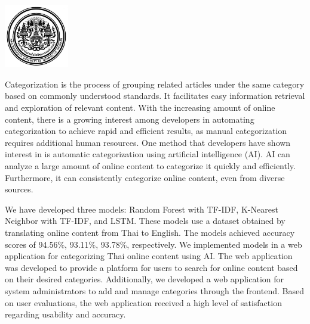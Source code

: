 \documentclass[12pt,oneside,openright,a4paper]{cpe-thai-project}
\begin{document}
\pdfstringdefDisableCommands{%
\let\MakeUppercase\relax
}

\begin{center}
  \includegraphics[width=2.8cm]{logo02.jpg}
\end{center}
\vspace*{-1cm}

\maketitlepage
\makesignaturepage 

\abstract

\hspace{1cm}Categorization is the process of grouping related articles under the same category based on commonly understood standards. 
It facilitates easy information retrieval and exploration of relevant content. With the increasing amount of online content, 
there is a growing interest among developers in automating categorization to achieve rapid and efficient results, 
as manual categorization requires additional human resources.
One method that developers have shown interest in is automatic categorization using artificial intelligence (AI). 
AI can analyze a large amount of online content to categorize it quickly and efficiently. 
Furthermore, it can consistently categorize online content, even from diverse sources.

\hspace{1cm}We have developed three models: Random Forest with TF-IDF, K-Nearest Neighbor with TF-IDF, and LSTM. 
These models use a dataset obtained by translating online content from Thai to English. 
The models achieved accuracy scores of 94.56\%, 93.11\%, 93.78\%, respectively. 
We implemented models in a web application for categorizing Thai online content using AI. 
The web application was developed to provide a platform for users to search for online content based on their desired categories. 
Additionally, we developed a web application for system administrators to add and manage categories through the frontend. 
Based on user evaluations, the web application received a high level of satisfaction regarding usability and accuracy. 
\end{document}
